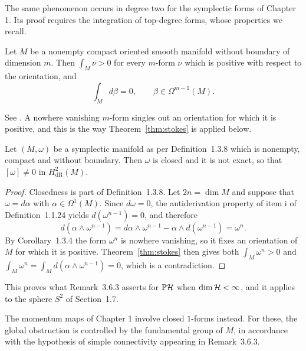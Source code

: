 The same phenomenon occurs in degree two for the symplectic forms of Chapter 1. Its proof requires the integration of top-degree forms, whose properties we recall.

\begin{theorem}[Stokes]\label{thm:stokes}
	Let $M$ be a nonempty compact oriented smooth manifold without boundary of dimension $m$. Then $\int_M\nu>0$ for every $m$-form $\nu$ which is positive with respect to the orientation, and
	\begin{equation*}
		\int_Md\beta=0, \qquad \beta\in\Omega^{m-1}(M).
	\end{equation*}
\end{theorem}

\noindent See \cite[TODO-location]{TODO-Lee13}. A nowhere vanishing $m$-form singles out an orientation for which it is positive, and this is the way Theorem~\ref{thm:stokes} is applied below.

\begin{proposition}\label{prop:compact-not-exact}
	Let $(M,\omega)$ be a symplectic manifold as per Definition~1.3.8 which is nonempty, compact and without boundary. Then $\omega$ is closed and it is not exact, so that $[\omega]\neq0$ in $H^2_{\mathrm{dR}}(M)$.
\end{proposition}

\begin{proof}
	Closedness is part of Definition~1.3.8. Let $2n=\dim M$ and suppose that $\omega=d\alpha$ with $\alpha\in\Omega^1(M)$. Since $d\omega=0$, the antiderivation property of item i of Definition~1.1.24 yields $d(\omega^{n-1})=0$, and therefore
	\begin{equation*}
		d(\alpha\wedge\omega^{n-1})=d\alpha\wedge\omega^{n-1}-\alpha\wedge d(\omega^{n-1})=\omega^n.
	\end{equation*}
	By Corollary~1.3.4 the form $\omega^n$ is nowhere vanishing, so it fixes an orientation of $M$ for which it is positive. Theorem~\ref{thm:stokes} then gives both $\int_M\omega^n>0$ and $\int_M\omega^n=\int_Md(\alpha\wedge\omega^{n-1})=0$, which is a contradiction.
\end{proof}

\noindent This proves what Remark~3.6.3 asserts for $\mathbb{P}\H$ when $\dim\H<\infty$, and it applies to the sphere $S^2$ of Section~1.7.

The momentum maps of Chapter 1 involve closed $1$-forms instead. For these, the global obstruction is controlled by the fundamental group of $M$, in accordance with the hypothesis of simple connectivity appearing in Remark~3.6.3.

